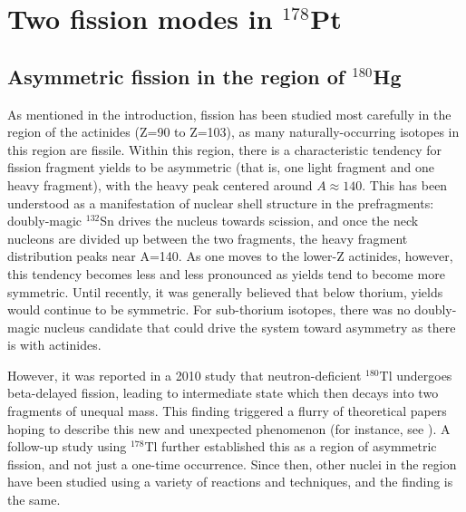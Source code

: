 \chapter{Two fission modes in $^{178}$Pt}\label{chap:178Pt}

\section{Asymmetric fission in the region of $^{180}$Hg}
As mentioned in the introduction, fission has been studied most carefully in the region of the actinides (Z=90 to Z=103), as many naturally-occurring isotopes in this region are fissile. Within this region, there is a characteristic tendency for fission fragment yields to be asymmetric (that is, one light fragment and one heavy fragment), with the heavy peak centered around $A\approx140$. This has been understood as a manifestation of nuclear shell structure in the prefragments: doubly-magic $^{132}$Sn drives the nucleus towards scission, and once the neck nucleons are divided up between the two fragments, the heavy fragment distribution peaks near A=140. As one moves to the lower-Z actinides, however, this tendency becomes less and less pronounced as yields tend to become more symmetric. Until recently, it was generally believed that below thorium, yields would continue to be symmetric. For sub-thorium isotopes, there was no doubly-magic nucleus candidate that could drive the system toward asymmetry as there is with actinides.

However, it was reported in a 2010 study \cite{Andreyev2010} that neutron-deficient $^{180}$Tl undergoes beta-delayed fission, leading to intermediate state {\Hg} which then decays into two fragments of unequal mass. This finding triggered a flurry of theoretical papers hoping to describe this new and unexpected phenomenon (for instance, see \cite{Warda2012,Moller2012,Mcdonnell2014,Ichikawa2019}). A follow-up study using $^{178}$Tl \cite{Liberati2013} further established this as a region of asymmetric fission, and not just a one-time occurrence. Since then, other nuclei in the region have been studied using a variety of reactions and techniques, and the finding is the same. 


